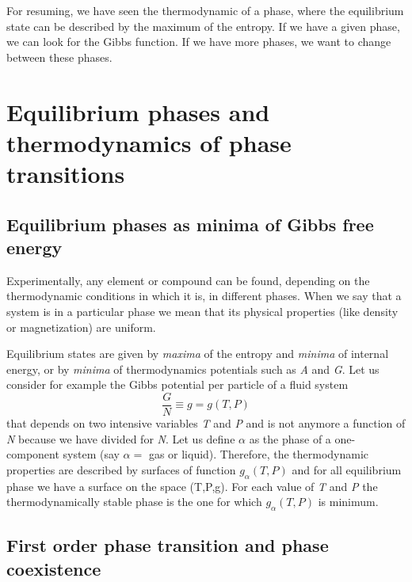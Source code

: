 \documentclass[../main/main.tex]{subfiles}
\begin{document}
For resuming, we have seen the thermodynamic of a phase, where the equilibrium state can be described by the maximum of the entropy. If we have a given phase, we can look for the Gibbs function. If we have more phases, we want to change between these phases.















\chapter{Equilibrium phases and thermodynamics of phase transitions}


\section{Equilibrium phases as minima of Gibbs free energy}

Experimentally, any element or compound can be found, depending on the thermodynamic conditions in which it is, in different phases. When we say that a system is in a particular phase we mean that its physical properties (like density or magnetization) are uniform.

Equilibrium states are given by \emph{maxima} of the entropy and \emph{minima} of internal energy, or by \emph{minima} of thermodynamics potentials such as \emph{A} and \emph{G}.
Let us consider for example the Gibbs potential per particle of a fluid system
\begin{equation}
  \frac{G}{N} \equiv g = g (T,P)
  \label{eq:}
\end{equation}
  that depends on two intensive variables \emph{T} and \emph{P} and is not anymore a function of \emph{N} because we have divided for \emph{N}.
  Let us define \( \alpha  \) as the phase of a one-component system (say \( \alpha = \) gas or liquid). Therefore, the thermodynamic properties are described by surfaces of function \( g_\alpha (T,P) \) and for all equilibrium phase we have a surface on the space (T,P,g). For each value of \emph{T} and \emph{P} the thermodynamically stable phase is the one for which \( g_ \alpha (T,P) \) is minimum.

\section{First order phase transition and phase coexistence}
\end{document}
